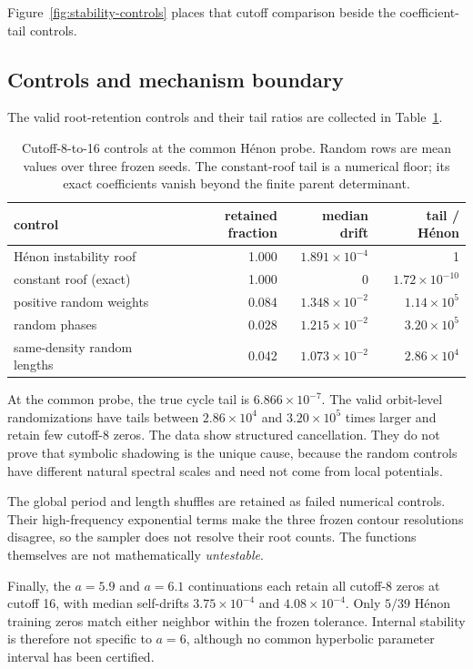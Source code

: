 Figure~\ref{fig:stability-controls} places that cutoff comparison beside the
coefficient-tail controls.


\subsection{Controls and mechanism boundary}

The valid root-retention controls and their tail ratios are collected in
Table~\ref{tab:controls}.
\begin{table}[t]
\centering
\caption{Cutoff-8-to-16 controls at the common H\'enon probe.  Random rows are
mean values over three frozen seeds.  The constant-roof tail is a numerical
floor; its exact coefficients vanish beyond the finite parent determinant.}
\label{tab:controls}
\begin{tabular}{lrrr}
\toprule
control&retained fraction&median drift&tail / H\'enon\\
\midrule
H\'enon instability roof&1.000&\(1.891\times10^{-4}\)&1\\
constant roof (exact)&1.000&0&\(1.72\times10^{-10}\)\\
positive random weights&0.084&\(1.348\times10^{-2}\)&\(1.14\times10^5\)\\
random phases&0.028&\(1.215\times10^{-2}\)&\(3.20\times10^5\)\\
same-density random lengths&0.042&\(1.073\times10^{-2}\)&\(2.86\times10^4\)\\
\bottomrule
\end{tabular}
\end{table}

At the common probe, the true cycle tail is \(6.866\times10^{-7}\).  The
valid orbit-level randomizations have tails between \(2.86\times10^4\) and
\(3.20\times10^5\) times larger and retain few cutoff-8 zeros.  The data show
structured cancellation.  They do not prove that symbolic shadowing is the
unique cause, because the random controls have different natural spectral
scales and need not come from local potentials.

The global period and length shuffles are retained as failed numerical
controls.  Their high-frequency exponential terms make the three frozen
contour resolutions disagree, so the sampler does not resolve their root
counts.  The functions themselves are not mathematically \emph{untestable}.

Finally, the \(a=5.9\) and \(a=6.1\) continuations each retain all cutoff-8
zeros at cutoff 16, with median self-drifts \(3.75\times10^{-4}\) and
\(4.08\times10^{-4}\).  Only \(5/39\) H\'enon training zeros match either
neighbor within the frozen tolerance.  Internal stability is therefore not
specific to \(a=6\), although no common hyperbolic parameter interval has been
certified.
